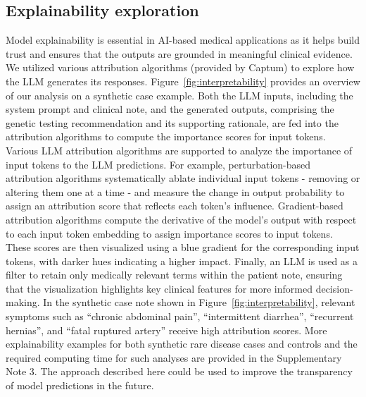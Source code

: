 \documentclass[fleqn,10pt]{wlscirep}
\begin{document}
\subsection*{Explainability exploration}
Model explainability is essential in AI-based medical applications as it helps build trust and ensures that the outputs are grounded in meaningful clinical evidence. We utilized various attribution algorithms (provided by Captum) to explore how the LLM generates its responses.\cite{kokhlikyan2020captum} Figure~\ref{fig:interpretability} provides an overview of our analysis on a synthetic case example. Both the LLM inputs, including the system prompt and clinical note, and the generated outputs, comprising the genetic testing recommendation and its supporting rationale, are fed into the attribution algorithms to compute the importance scores for input tokens. Various LLM attribution algorithms are supported to analyze the importance of input tokens to the LLM predictions. For example, perturbation-based attribution algorithms systematically ablate individual input tokens - removing or altering them one at a time - and measure the change in output probability to assign an attribution score that reflects each token’s influence. Gradient-based attribution algorithms compute the derivative of the model’s output with respect to each input token embedding to assign importance scores to input tokens.\cite{sundararajan2017axiomatic} These scores are then visualized using a blue gradient for the corresponding input tokens, with darker hues indicating a higher impact. Finally, an LLM is used as a filter to retain only medically relevant terms within the patient note, ensuring that the visualization highlights key clinical features for more informed decision-making. In the synthetic case note shown in Figure~\ref{fig:interpretability}, relevant symptoms such as ``chronic abdominal pain'', ``intermittent diarrhea'', ``recurrent hernias'', and ``fatal ruptured artery'' receive high attribution scores. More explainability examples for both synthetic rare disease cases and controls and the required computing time for such analyses are provided in the Supplementary Note 3. The approach described here could be used to improve the transparency of model predictions in the future.



\end{document}
